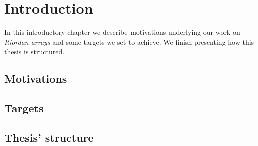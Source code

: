 
\chapter{Introduction}
\label{ch:introduction}

In this introductory chapter we describe motivations underlying our work on
\emph{Riordan arrays} and some targets we set to achieve. We finish presenting
how this thesis is structured.

\section{Motivations}


\section{Targets}


\section{Thesis' structure}

